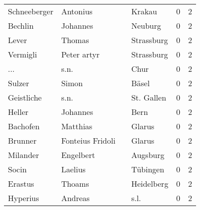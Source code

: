 \begin{center}
\begin{tiny}
\begin{longtabu}{llllrr}
             Schneeberger &                           Antonius &             &                                      Krakau &          0 &         2 \\
                  Bechlin &                           Johannes &             &                                     Neuburg &          0 &         2 \\
                    Lever &                             Thomas &             &                                  Strassburg &          0 &         2 \\
                 Vermigli &                        Peter artyr &             &                                  Strassburg &          0 &         2 \\
                      ... &                               s.n. &             &                                        Chur &          0 &         2 \\
                   Sulzer &                              Simon &             &                                       Bäsel &          0 &         2 \\
               Geistliche &                               s.n. &             &                                  St. Gallen &          0 &         2 \\
                   Heller &                           Johannes &             &                                        Bern &          0 &         2 \\
                 Bachofen &                           Matthias &             &                                      Glarus &          0 &         2 \\
                  Brunner &                   Fonteius Fridoli &             &                                      Glarus &          0 &         2 \\
                 Milander &                          Engelbert &             &                                    Augsburg &          0 &         2 \\
                    Socin &                            Laelius &             &                                    Tübingen &          0 &         2 \\
                  Erastus &                             Thoams &             &                                  Heidelberg &          0 &         2 \\
                 Hyperius &                            Andreas &             &                                        s.l. &          0 &         2 \\

\end{longtabu}
\end{tiny}
\end{center}
